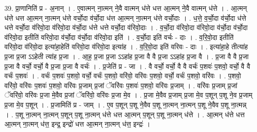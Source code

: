 \documentclass[17pt]{extarticle}
\begin{document}
39. प्रा॒णानिति॑ प्र - अ॒नान् । . ए॒वात्मन् ना॒त्मन् ने॒वै वात्मन् ध॑त्ते धत्त आ॒त्मन् ने॒वै वात्मन् ध॑त्ते । . आ॒त्मन् ध॑त्ते धत्त आ॒त्मन् ना॒त्मन् ध॑त्ते वर्चो॒दा व॑र्चो॒दा ध॑त्त आ॒त्मन् ना॒त्मन् ध॑त्ते वर्चो॒दाः । . ध॒त्ते॒ व॒र्चो॒दा व॑र्चो॒दा ध॑त्ते धत्ते वर्चो॒दा व॑रिवो॒दा व॑रिवो॒दा व॑र्चो॒दा ध॑त्ते धत्ते वर्चो॒दा व॑रिवो॒दाः । . व॒र्चो॒दा व॑रिवो॒दा व॑रिवो॒दा व॑र्चो॒दा व॑र्चो॒दा व॑रिवो॒दा इतीति॑ वरिवो॒दा व॑र्चो॒दा व॑र्चो॒दा व॑रिवो॒दा इति॑ । . व॒र्चो॒दा इति॑ वर्चः - दाः । . व॒रि॒वो॒दा इतीति॑ वरिवो॒दा व॑रिवो॒दा इत्या॑हा॒हेति॑ वरिवो॒दा व॑रिवो॒दा इत्या॑ह । . व॒रि॒वो॒दा इति॑ वरिवः - दाः । . इत्या॑हा॒हे तीत्या॑ह प्र॒जा प्र॒जा ऽऽहेती त्या॑ह प्र॒जा । . आ॒ह॒ प्र॒जा प्र॒जा ऽऽहा॑ह प्र॒जा वै वै प्र॒जा ऽऽहा॑ह प्र॒जा वै । . प्र॒जा वै वै प्र॒जा प्र॒जा वै वर्चो॒ वर्चो॒ वै प्र॒जा प्र॒जा वै वर्चः॑ । . प्र॒जेति॑ प्र - जा । . वै वर्चो॒ वर्चो॒ वै वै वर्चः॑ प॒शवः॑ प॒शवो॒ वर्चो॒ वै वै वर्चः॑ प॒शवः॑ । . वर्चः॑ प॒शवः॑ प॒शवो॒ वर्चो॒ वर्चः॑ प॒शवो॒ वरि॑वो॒ वरि॑वः प॒शवो॒ वर्चो॒ वर्चः॑ प॒शवो॒ वरि॑वः । . प॒शवो॒ वरि॑वो॒ वरि॑वः प॒शवः॑ प॒शवो॒ वरि॑वः प्र॒जाम् प्र॒जां ॅवरि॑वः प॒शवः॑ प॒शवो॒ वरि॑वः प्र॒जाम् । . वरि॑वः प्र॒जाम् प्र॒जां ॅवरि॑वो॒ वरि॑वः प्र॒जा मे॒वैव प्र॒जां ॅवरि॑वो॒ वरि॑वः प्र॒जा मे॒व । . प्र॒जा मे॒वैव प्र॒जाम् प्र॒जा मे॒व प॒शून् प॒शू ने॒व प्र॒जाम् प्र॒जा मे॒व प॒शून् । . प्र॒जामिति॑ प्र - जाम् । . ए॒व प॒शून् प॒शू ने॒वैव प॒शू ना॒त्मन् ना॒त्मन् प॒शू ने॒वैव प॒शू ना॒त्मन्न् । . प॒शू ना॒त्मन् ना॒त्मन् प॒शून् प॒शू ना॒त्मन् ध॑त्ते धत्त आ॒त्मन् प॒शून् प॒शू ना॒त्मन् ध॑त्ते । . आ॒त्मन् ध॑त्ते धत्त आ॒त्मन् ना॒त्मन् ध॑त्त॒ इन्द्र॒ इन्द्रो॑ धत्त आ॒त्मन् ना॒त्मन् ध॑त्त॒ इन्द्रः॑ । \newline
\end{document}
